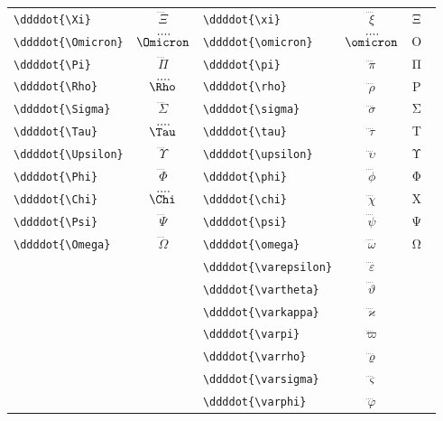 \documentclass[12pt,a4paper]{article}
\begin{document}
\begin{longtable}{|l|c|l|c|c|}
\verb|\ddddot{\Xi}|         & $\ddddot{\Xi}$      & \verb|\ddddot{\xi}|         & $\ddddot{\xi}$         & Ξ⃜ ξ⃜ \\
\verb|\ddddot{\Omicron}|    & $\ddddot{\Omicron}$ & \verb|\ddddot{\omicron}|    & $\ddddot{\omicron}$    & Ο⃜ ο⃜ \\
\verb|\ddddot{\Pi}|         & $\ddddot{\Pi}$      & \verb|\ddddot{\pi}|         & $\ddddot{\pi}$         & Π⃜ π⃜ \\
\verb|\ddddot{\Rho}|        & $\ddddot{\Rho}$     & \verb|\ddddot{\rho}|        & $\ddddot{\rho}$        & Ρ⃜ ρ⃜ \\
\verb|\ddddot{\Sigma}|      & $\ddddot{\Sigma}$   & \verb|\ddddot{\sigma}|      & $\ddddot{\sigma}$      & Σ⃜ σ⃜ \\
\verb|\ddddot{\Tau}|        & $\ddddot{\Tau}$     & \verb|\ddddot{\tau}|        & $\ddddot{\tau}$        & Τ⃜ τ⃜ \\
\verb|\ddddot{\Upsilon}|    & $\ddddot{\Upsilon}$ & \verb|\ddddot{\upsilon}|    & $\ddddot{\upsilon}$    & Υ⃜ υ⃜ \\
\verb|\ddddot{\Phi}|        & $\ddddot{\Phi}$     & \verb|\ddddot{\phi}|        & $\ddddot{\phi}$        & Φ⃜ φ⃜ \\
\verb|\ddddot{\Chi}|        & $\ddddot{\Chi}$     & \verb|\ddddot{\chi}|        & $\ddddot{\chi}$        & Χ⃜ χ⃜ \\
\verb|\ddddot{\Psi}|        & $\ddddot{\Psi}$     & \verb|\ddddot{\psi}|        & $\ddddot{\psi}$        & Ψ⃜ ψ⃜ \\
\verb|\ddddot{\Omega}|      & $\ddddot{\Omega}$   & \verb|\ddddot{\omega}|      & $\ddddot{\omega}$      & Ω⃜ ω⃜ \\
                            &                     & \verb|\ddddot{\varepsilon}| & $\ddddot{\varepsilon}$ & ε⃜ \\
                            &                     & \verb|\ddddot{\vartheta}|   & $\ddddot{\vartheta}$   & ϑ⃜ \\
                            &                     & \verb|\ddddot{\varkappa}|   & $\ddddot{\varkappa}$   & ϰ⃜ \\
                            &                     & \verb|\ddddot{\varpi}|      & $\ddddot{\varpi}$      & ϖ⃜ \\
                            &                     & \verb|\ddddot{\varrho}|     & $\ddddot{\varrho}$     & ϱ⃜ \\
                            &                     & \verb|\ddddot{\varsigma}|   & $\ddddot{\varsigma}$   & ς⃜ \\
                            &                     & \verb|\ddddot{\varphi}|     & $\ddddot{\varphi}$     & ϕ⃜ \\
\hline
\end{longtable}
\end{document}
